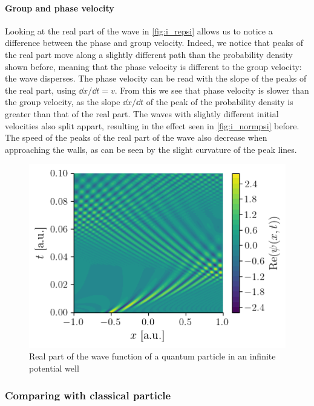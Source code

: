 \paragraph{Group and phase velocity} Looking at the real part of the wave in \autoref{fig:i_repsi} allows us to notice a difference between the phase and group velocity. Indeed, we notice that peaks of the real part move along a slightly different path than the probability density shown before, meaning that the phase velocity is different to the group velocity: the wave disperses. The phase velocity can be read with the slope of the peaks of the real part, using \(\dd x / \dd t = v\). From this we see that phase velocity is slower than the group velocity, as the slope \(\dd x / \dd t\) of the peak of the probability density is greater than that of the real part. The waves with slightly different initial velocities also split appart, resulting in the effect seen in \autoref{fig:i_normpsi} before. The speed of the peaks of the real part of the wave also decrease when approaching the walls, as can be seen by the slight curvature of the peak lines.
\begin{figure}[h]
    \centering
    \includegraphics[width=0.6\linewidth]{figures/i_repsi.png}
    \caption{Real part of the wave function of a quantum particle in an infinite potential well}
    \label{fig:i_repsi}
\end{figure}

\subsubsection{Comparing with classical particle}

